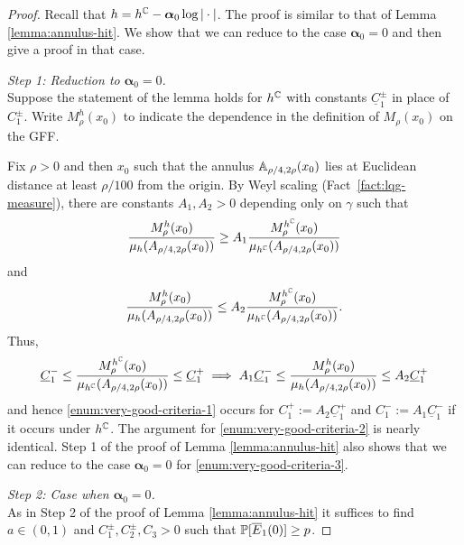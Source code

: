 \documentclass[12pt]{amsart}
\numberwithin{equation}{section}
\newcommand{\Mrho}[2]{\hyperref[eq:alternate-size]{M_{#1}(#2)}}
\begin{document}
	\begin{proof}
		Recall that $h = h^\C -\boldsymbol{\alpha}_0 \log |\cdot|$. The proof is similar to that of Lemma \ref{lemma:annulus-hit}. We show that 
		we can reduce to the case $\boldsymbol{\alpha}_0 = 0$ and then give a proof in that case. 
		
		{\it Step 1: Reduction to $\boldsymbol{\alpha}_0 = 0$.} \\
		Suppose the statement of the lemma holds for $h^{\C}$ with constants $\underline{C}^{\pm}_1$ in place of $C^{\pm}_1$.  Write $M^{h}_{\rho}(x_0)$ to indicate the dependence in the definition of $\Mrho{\rho}{x_0}$
		on the GFF. 
		
		
		Fix $\rho > 0$ and then $x_0$ such that the annulus $\A_{\rho/4, 2\rho}(x_0)$ lies at Euclidean distance at least $\rho/100$ from the origin. 
		By Weyl scaling (Fact~\ref{fact:lqg-measure}), there are constants $A_1,A_2>  0$ depending only on $\gamma$ such that 
		\begin{equation}
		\frac{M^{h}_{\rho}(x_0)}{\mu_h(A_{\rho/4, 2 \rho}(x_0))} \geq A_1  \frac{M^{h^\C}_{\rho}(x_0)}{\mu_{h^\C}(A_{\rho/4, 2 \rho}(x_0))}
		\end{equation}
		and
		\begin{equation}
		\frac{M^{h}_{\rho}(x_0)}{\mu_h(A_{\rho/4, 2 \rho}(x_0))} \leq A_2  \frac{M^{h^\C}_{\rho}(x_0)}{\mu_{h^\C}(A_{\rho/4, 2 \rho}(x_0))}.
		\end{equation} 
		Thus, 
		\[
		\underline{C}^{-}_1 \leq  \frac{M^{h^\C}_{\rho}(x_0)}{\mu_{h^\C}(A_{\rho/4, 2 \rho}(x_0))} \leq \underline{C}^{+}_1 \implies A_1 \underline{C}^{-}_1 \leq \frac{M^{h}_{\rho}(x_0)}{\mu_h(A_{\rho/4, 2 \rho}(x_0))} \leq A_2 \underline{C}^{+}_1 
		\]	
		and hence \ref{enum:very-good-criteria-1} occurs for $C^+_1 := A_2 \underline{C}^{+}_1$ and $C^-_1 := A_1 \underline{C}^{-}_1$ if it occurs under $h^{\C}$.
		The argument for \ref{enum:very-good-criteria-2} is nearly identical. Step 1 of the proof of Lemma \ref{lemma:annulus-hit} also shows that we can 
		reduce to the case $\boldsymbol{\alpha}_0 = 0$ for \ref{enum:very-good-criteria-3}.
		
		
		
		
		
		
		
		{\it Step 2: Case when $\boldsymbol{\alpha}_0 = 0$.} \\
		As in Step 2 of the proof of Lemma \ref{lemma:annulus-hit} it suffices to find $a \in (0,1)$
		and  $C^{\pm}_1, C^{\pm}_2, C_3 > 0$ such that $\P[\overline E_1(0)] \geq p$.
		

\end{proof}
\end{document}
